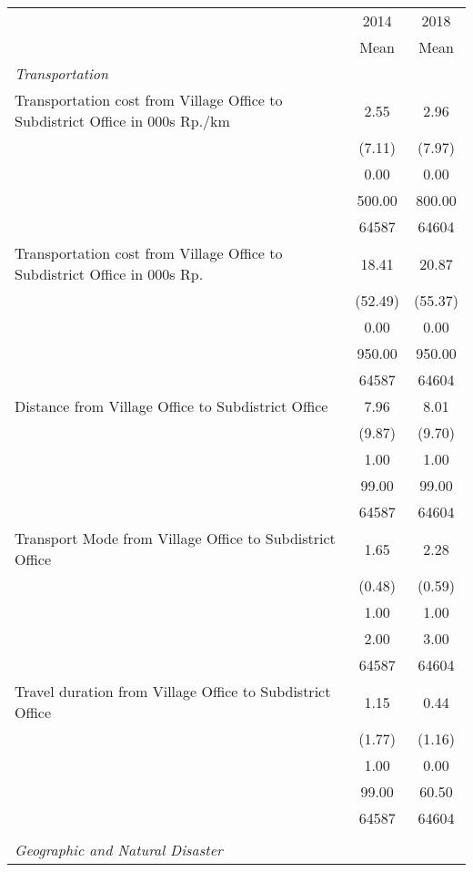 \begin{tabular}{l*{2}{c}}
\toprule
                &     2014&     2018\\
                &     Mean&     Mean\\
\midrule
\emph{Transportation}&         &         \\
Transportation cost from Village Office to Subdistrict Office in 000s Rp./km&     2.55&     2.96\\
                &   (7.11)&   (7.97)\\
                &     0.00&     0.00\\
                &   500.00&   800.00\\
                &    64587&    64604\\
Transportation cost from Village Office to Subdistrict Office in 000s Rp.&    18.41&    20.87\\
                &  (52.49)&  (55.37)\\
                &     0.00&     0.00\\
                &   950.00&   950.00\\
                &    64587&    64604\\
Distance from Village Office to Subdistrict Office&     7.96&     8.01\\
                &   (9.87)&   (9.70)\\
                &     1.00&     1.00\\
                &    99.00&    99.00\\
                &    64587&    64604\\
Transport Mode from Village Office to Subdistrict Office&     1.65&     2.28\\
                &   (0.48)&   (0.59)\\
                &     1.00&     1.00\\
                &     2.00&     3.00\\
                &    64587&    64604\\
Travel duration from Village Office to Subdistrict Office&     1.15&     0.44\\
                &   (1.77)&   (1.16)\\
                &     1.00&     0.00\\
                &    99.00&    60.50\\
                &    64587&    64604\\
\vspace{0.1em} \\ \emph{Geographic and Natural Disaster}&         &         \\

\end{tabular}
